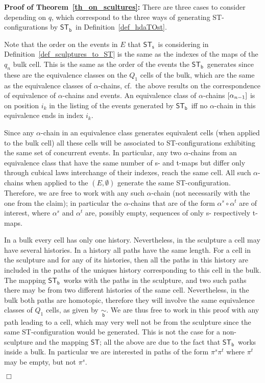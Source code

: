 \documentclass[submission,copyright,creativecommons]{eptcs}
\newenvironment{proof}[1][\!\!\,]{\vspace{1ex}\noindent\textbf{Proof #1: }}{\hfill$\Box$\vspace{2ex}}
\newcounter{case}
\newcommand\hintost{\ensuremath{\mathsf{ST}}}
\newcommand\sculpintost{\ensuremath{\mathsf{ST}_{\!\mathsf{s}}}}
\newcommand\hintostScultures{\ensuremath{\mathsf{ST}_{\!\mathsf{b}}}}
\newcommand\cellEquivBulk{\ensuremath{\underset{\mathsf{b}}{\sim}}}
\newcommand{\equivClass}[2][]{\ensuremath{[#2]\ifthenelse{\equal{#1}{}}{}{_{#1}}}}
\begin{document}
\begin{proof}[of Theorem~\ref{th_on_scultures}]
There are three cases to consider depending on $q$, which correspond to the three ways of generating ST-configurations by \hintostScultures\ in Definition~\ref{def_hdaTOst}.

Note that the order on the events in $E$ that \sculpintost\ is considering in Definition~\ref{def_sculptures_to_ST} is the same as the indexes of the maps of the $q_{n}$ bulk cell. This is the same as the order of the events the \hintostScultures\ generates since these are the equivalence classes on the $Q_{1}$ cells of the bulk, which are the same as the equivalence classes of $\alpha$-chains, cf.\ the above results on the correspondence of equivalence of $\alpha$-chains and events. An equivalence class of $\alpha$-chains $\equivClass{\alpha_{n-1}}$ is on position $i_{k}$ in the listing of the events generated by \hintostScultures\ iff no $\alpha$-chain in this equivalence ends in index $i_{k}$.

Since any $\alpha$-chain in an equivalence class generates equivalent cells (when applied to the bulk cell) all these cells will be associated to ST-configurations exhibiting the same set of concurrent events. In particular, any two $\alpha$-chains from an equivalence class that have the same number of s- and t-maps but differ only through cubical laws interchange of their indexes, reach the same cell. All such $\alpha$-chains when applied to the $(E,\emptyset)$ generate the same ST-configuration. Therefore, we are free to work with any such $\alpha$-chain (not necessarily with the one from the claim); in particular the $\alpha$-chains that are of the form $\alpha^{s}\circ\alpha^{t}$ are of interest, where $\alpha^{s}$ and $\alpha^{t}$ are, possibly empty, sequences of only s- respectively t-maps.


In a bulk every cell has only one history. 
Nevertheless, in the sculpture a cell may have several histories.
In a history all paths have the same length.
For a cell in the sculpture and for any of its histories, then all the paths in this history are included in the paths of the uniques history corresponding to this cell in the bulk.
The mapping \hintostScultures\ works with the paths in the sculpture, and two such paths there may be from two different histories of the same cell. Nevertheless, in the bulk both paths are homotopic, therefore they will involve the same equivalence classes of $Q_{1}$ cells, as given by \cellEquivBulk. We are thus free to work in this proof with any path leading to a cell, which may very well not be from the sculpture since the same ST-configuration would be generated. This is not the case for a non-sculpture and the mapping \hintost; all the above are due to the fact that \hintostScultures\ works inside a bulk.
In particular we are interested in paths of the form $\pi^{s}\pi^{t}$ where $\pi^{t}$ may be empty, but not $\pi^{s}$.


\end{proof}
\end{document}
